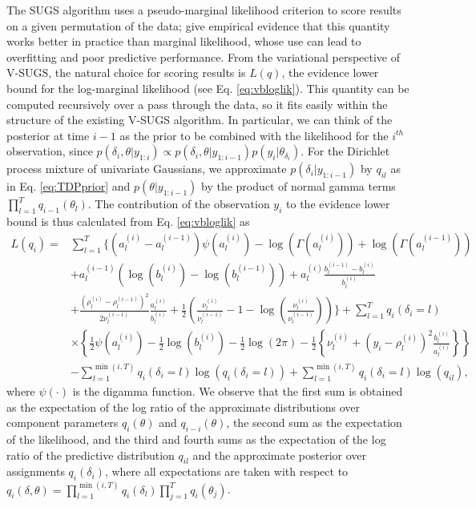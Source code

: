 \documentclass{uwstat572}
\begin{document}
The SUGS algorithm uses a pseudo-marginal likelihood criterion to score results on a given permutation of the data; \cite{wang} give empirical evidence that this quantity works better in practice than marginal likelihood, whose use can lead to overfitting and poor predictive performance. From the variational perspective of V-SUGS, the natural choice for scoring results is $L(q)$, the evidence lower bound for the log-marginal likelihood (see Eq. \ref{eq:vbloglik}). This quantity can be computed recursively over a pass through the data, so it fits easily within the structure of the existing V-SUGS algorithm. In particular, we can think of the posterior at time $i-1$ as the prior to be combined with the likelihood for the $i^{th}$ observation, since $p(\delta_i, \theta | y_{1:i}) \propto p(\delta_i,\theta | y_{1:i-1}) p(y_i | \theta_{\delta_i})$. For the Dirichlet process mixture of univariate Gaussians, we approximate $p(\delta_i | y_{1:i-1})$ by $q_{il}$ as in Eq. \ref{eq:TDPprior} and $p(\theta | y_{1:i-1})$ by the product of normal gamma terms $\prod_{l=1}^T q_{i-1}(\theta_l)$. The contribution of the observation $y_i$ to the evidence lower bound is thus calculated from Eq. \ref{eq:vbloglik} as
\begin{align}
L(q_i) = &\sum_{l=1}^T \bigg\{ (a_l^{(i)}-a_l^{(i-1)})\psi(a_l^{(i)}) - \log(\Gamma(a_l^{(i)})) + \log(\Gamma(a_l^{(i-1)})) \nonumber \\
&+a_l^{(i-1)}(\log(b_l^{(i)})-\log(b_l^{(i-1)}))+ a_l^{(i)}\frac{b_l^{(i-1)}-b_l^{(i)}}{b_l^{(i)}}  \nonumber \\
&+ \frac{(\rho_l^{(i)}-\rho_l^{(i-1)})^2}{2\nu_l^{(i-1)}}\frac{a_l^{(i)}}{b_l^{(i)}} + \frac{1}{2}\left( \frac{\nu_l^{(i)}}{\nu_l^{(i-1)}} - 1 - \log\left( \frac{\nu_l^{(i)}}{\nu_l^{(i-1)}}\right)\right)\bigg\} + \sum_{l=1}^T q_i(\delta_i = l) \nonumber \\
&\times \left\{ \frac{1}{2}\psi( a_l^{(i)}) - \frac{1}{2}\log(b_l^{(i)}) - \frac{1}{2}\log(2\pi) - \frac{1}{2}\left\{ \nu_l^{(i)} +(y_i - \rho_l^{(i)})^2 \frac{b_l^{(i)}}{a_l^{(i)}} \right\} \right\}   \nonumber \\
&- \sum_{l=1}^{\min(i,T)} q_i(\delta_i = l) \log(q_i(\delta_i = l)) + \sum_{l=1}^{\min(i,T)}  q_i(\delta_i = l) \log(q_{il}), \nonumber
\end{align}
where $\psi(\cdot)$ is the digamma function. We observe that the first sum is obtained as the expectation of the log ratio of the approximate distributions over component parameters $q_i(\theta)$ and $q_{i-i}(\theta)$, the second sum as the expectation of the likelihood, and the third and fourth sums as the expectation of the log ratio of the predictive distribution $q_{il}$ and the approximate posterior over assignments $q_i(\delta_i)$, where all expectations are taken with respect to $q_i(\delta,\theta) = \prod_{l=1}^{\min(i,T)} q_i(\delta_l) \prod_{j=1}^T q_i(\theta_j)$. 
\end{document}
